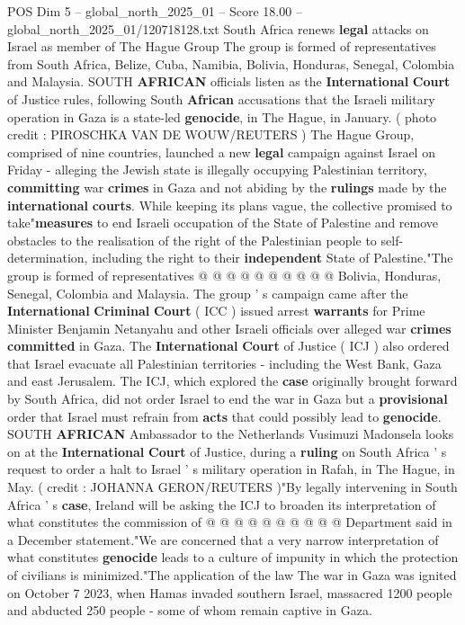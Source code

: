 \begin{textsample}{POS Dim 5 – global\_north\_2025\_01 – Score 18.00 – global\_north\_2025\_01/120718128.txt}  \label{ex:f5_pos_265}
South Africa renews \textbf{legal} attacks on Israel as member of The Hague Group The group is formed of representatives from South Africa, Belize, Cuba, Namibia, Bolivia, Honduras, Senegal, Colombia and Malaysia.
SOUTH \textbf{AFRICAN} officials listen as the \textbf{International} \textbf{Court} of Justice rules, following South \textbf{African} accusations that the Israeli military operation in Gaza is a state-led \textbf{genocide}, in The Hague, in January. ( photo credit : PIROSCHKA VAN DE WOUW/REUTERS ) The Hague Group, comprised of nine countries, launched a new \textbf{legal} campaign against Israel on Friday - alleging the Jewish state is illegally occupying Palestinian territory, \textbf{committing} war \textbf{crimes} in Gaza and not abiding by the \textbf{rulings} made by the \textbf{international} \textbf{courts}.
While keeping its plans vague, the collective promised to take"\textbf{measures} to end Israeli occupation of the State of Palestine and remove obstacles to the realisation of the right of the Palestinian people to self-determination, including the right to their \textbf{independent} State of Palestine."The group is formed of representatives @ @ @ @ @ @ @ @ @ @ Bolivia, Honduras, Senegal, Colombia and Malaysia.
The group ' s campaign came after the \textbf{International} \textbf{Criminal} \textbf{Court} ( ICC ) issued arrest \textbf{warrants} for Prime Minister Benjamin Netanyahu and other Israeli officials over alleged war \textbf{crimes} \textbf{committed} in Gaza.
The \textbf{International} \textbf{Court} of Justice ( ICJ ) also ordered that Israel evacuate all Palestinian territories - including the West Bank, Gaza and east Jerusalem.
The ICJ, which explored the \textbf{case} originally brought forward by South Africa, did not order Israel to end the war in Gaza but a \textbf{provisional} order that Israel must refrain from \textbf{acts} that could possibly lead to \textbf{genocide}.
SOUTH \textbf{AFRICAN} Ambassador to the Netherlands Vusimuzi Madonsela looks on at the \textbf{International} \textbf{Court} of Justice, during a \textbf{ruling} on South Africa ' s request to order a halt to Israel ' s military operation in Rafah, in The Hague, in May. ( credit : JOHANNA GERON/REUTERS )"By legally intervening in South Africa ' s \textbf{case}, Ireland will be asking the ICJ to broaden its interpretation of what constitutes the commission of @ @ @ @ @ @ @ @ @ @ Department said in a December statement."We are concerned that a very narrow interpretation of what constitutes \textbf{genocide} leads to a culture of impunity in which the protection of civilians is minimized."The application of the law The war in Gaza was ignited on October 7 2023, when Hamas invaded southern Israel, massacred 1200 people and abducted 250 people - some of whom remain captive in Gaza.

\end{textsample}
